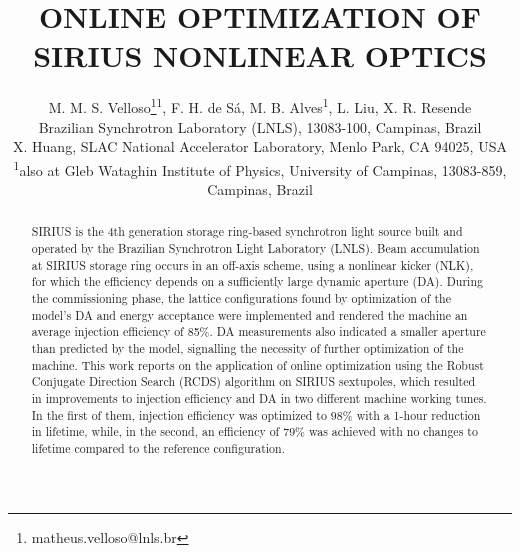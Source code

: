 \documentclass[a4paper,
               keeplastbox,   %
               ]{jacow}
\begin{document}
\title{ONLINE OPTIMIZATION OF SIRIUS NONLINEAR OPTICS}

\author{M. M. S. Velloso\thanks{matheus.velloso@lnls.br}\textsuperscript{1}, F. H. de Sá, M. B. Alves\textsuperscript{1}, L. Liu, X. R. Resende\\ Brazilian Synchrotron Laboratory (LNLS), 13083-100, Campinas, Brazil \\
		X. Huang, SLAC National Accelerator Laboratory, Menlo Park, CA 94025, USA \\
		\textsuperscript{1}also at Gleb Wataghin Institute of Physics, University of Campinas, 13083-859, Campinas, Brazil 
}
	
\maketitle
%
\begin{abstract}
SIRIUS is the 4th generation storage ring-based synchrotron light source built and operated by the Brazilian Synchrotron Light Laboratory (LNLS). Beam accumulation at SIRIUS storage ring occurs in an off-axis scheme, using a nonlinear kicker (NLK), for which the efficiency depends on a sufficiently large dynamic aperture (DA). During the commissioning phase, the lattice configurations found by optimization of the model's DA and energy acceptance were implemented and rendered the machine an average injection efficiency of 85\%. DA measurements also indicated a smaller aperture than predicted by the model, signalling the necessity of further optimization of the machine. 
This work reports on the application of online optimization using the Robust Conjugate Direction Search (RCDS) algorithm on SIRIUS sextupoles, which resulted in improvements to injection efficiency and DA in two different machine working tunes. In the first of them, injection efficiency was optimized to $98\%$ with a 1-hour reduction in lifetime, while, in the second, an efficiency of $79\%$ was achieved with no changes to lifetime compared to the reference configuration. 
\end{abstract}

\end{document}
